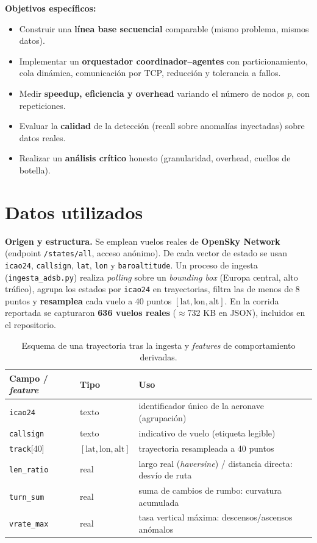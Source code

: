 \documentclass[letterpaper,11pt]{article}
\begin{document}
\textbf{Objetivos específicos:}
\begin{itemize}[nosep,leftmargin=1.3em]
  \item Construir una \textbf{línea base secuencial} comparable (mismo problema, mismos datos).
  \item Implementar un \textbf{orquestador coordinador--agentes} con particionamiento, cola dinámica,
        comunicación por TCP, reducción y tolerancia a fallos.
  \item Medir \textbf{speedup, eficiencia y overhead} variando el número de nodos $p$, con repeticiones.
  \item Evaluar la \textbf{calidad} de la detección (recall sobre anomalías inyectadas) sobre datos reales.
  \item Realizar un \textbf{análisis crítico} honesto (granularidad, overhead, cuellos de botella).
\end{itemize}

\section{Datos utilizados}
\textbf{Origen y estructura.} Se emplean vuelos reales de \textbf{OpenSky Network} (endpoint
\texttt{/states/all}, acceso anónimo). De cada vector de estado se usan \texttt{icao24}, \texttt{callsign},
\texttt{lat}, \texttt{lon} y \texttt{baroaltitude}. Un proceso de ingesta (\texttt{ingesta\_adsb.py})
realiza \emph{polling} sobre un \emph{bounding box} (Europa central, alto tráfico), agrupa los estados por
\texttt{icao24} en trayectorias, filtra las de menos de 8 puntos y \textbf{resamplea} cada vuelo a 40
puntos $[\text{lat},\text{lon},\text{alt}]$. En la corrida reportada se capturaron \textbf{636 vuelos
reales} ($\approx$732 KB en JSON), incluidos en el repositorio.

\begin{table}[H]\centering\small
\caption{Esquema de una trayectoria tras la ingesta y \emph{features} de comportamiento derivadas.}
\label{tab:esquema}
\begin{tabular}{lll}
\toprule
Campo / \emph{feature} & Tipo & Uso \\
\midrule
\texttt{icao24} & texto & identificador único de la aeronave (agrupación) \\
\texttt{callsign} & texto & indicativo de vuelo (etiqueta legible) \\
\texttt{track}[40] & $[\text{lat},\text{lon},\text{alt}]$ & trayectoria resampleada a 40 puntos \\
\midrule
\texttt{len\_ratio} & real & largo real (\emph{haversine}) / distancia directa: desvío de ruta \\
\texttt{turn\_sum} & real & suma de cambios de rumbo: curvatura acumulada \\
\texttt{vrate\_max} & real & tasa vertical máxima: descensos/ascensos anómalos \\
\bottomrule
\end{tabular}
\end{table}
\end{document}
